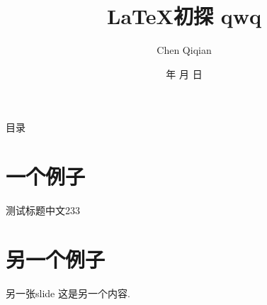 \documentclass[UTF-8]{beamer} %
\begin{document}
    \renewcommand{\today}{\number\year 年 \number\month 月 \number\day 日}
    \newtheorem{thm}{定理}[section]
     
    \title[\LaTeX~初探 qwq]{\LaTeX 初探 qwq}
    \author{Chen Qiqian}
    \date{\today}
     
    \begin{frame}
        \titlepage
    \end{frame}

    \begin{frame}{目录}
        \tableofcontents
    \end{frame}

    \section{一个例子}
        \begin{frame}{测试标题中文}{233}
        \end{frame}
    
    \section{另一个例子}
        \begin{frame}{另一张slide}%
            这是另一个内容.
        \end{frame}
\end{document}
